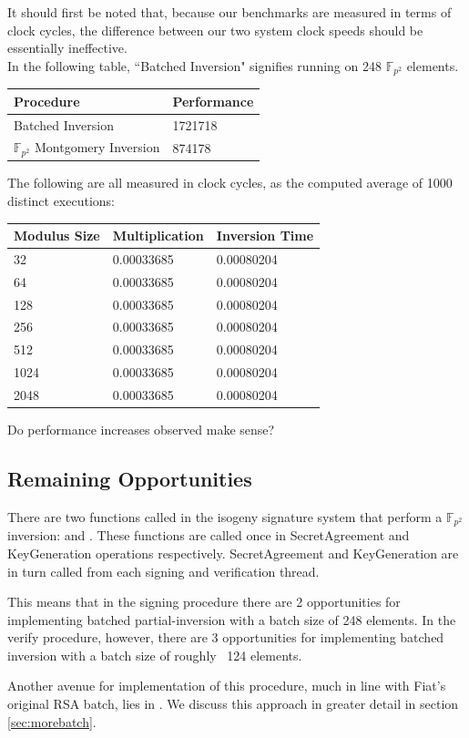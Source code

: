It should first be noted that, because our benchmarks are measured in terms of clock cycles, the difference between our two system clock speeds should be essentially ineffective. \\

In the following table, ``Batched Inversion" signifies running  on 248 $\mathbb{F}_{p^{2}}$ elements.

\begin{center}
\begin{tabular}{@{}ll@{}}
	\toprule
	Procedure & Performance \\
	\midrule
	Batched Inversion & 1721718\\
	$\mathbb{F}_{p^{2}}$ Montgomery Inversion & 874178\\
	\bottomrule
\end{tabular}
\end{center}

The following are all measured in clock cycles, as the computed average of 1000 distinct executions:

\begin{center}
\begin{tabular}{@{}lll@{}}
	\toprule
	Modulus Size & Multiplication & Inversion Time \\
	\midrule
	32 & 0.00033685 & 0.00080204\\
	64 & 0.00033685 & 0.00080204\\
	128 & 0.00033685 & 0.00080204\\
	256 & 0.00033685 & 0.00080204\\
	512 & 0.00033685 & 0.00080204\\
	1024 & 0.00033685 & 0.00080204\\
	2048 & 0.00033685 & 0.00080204\\
	\bottomrule
\end{tabular}
\end{center}

Do performance increases observed make sense?\\

\subsection{Remaining Opportunities}
There are two functions called in the isogeny signature system that perform a $\mathbb{F}_{p^{2}}$ inversion:  and . These functions are called once in SecretAgreement and KeyGeneration operations respectively. SecretAgreement and KeyGeneration are in turn called from each signing and verification thread.

This means that in the signing procedure there are 2 opportunities for implementing batched partial-inversion with a batch size of 248 elements. In the verify procedure, however, there are 3 opportunities for implementing batched inversion with a batch size of roughly ~124 elements.

Another avenue for implementation of this procedure, much in line with Fiat's original RSA batch, lies in . We discuss this approach in greater detail in section \ref{sec:morebatch}.
